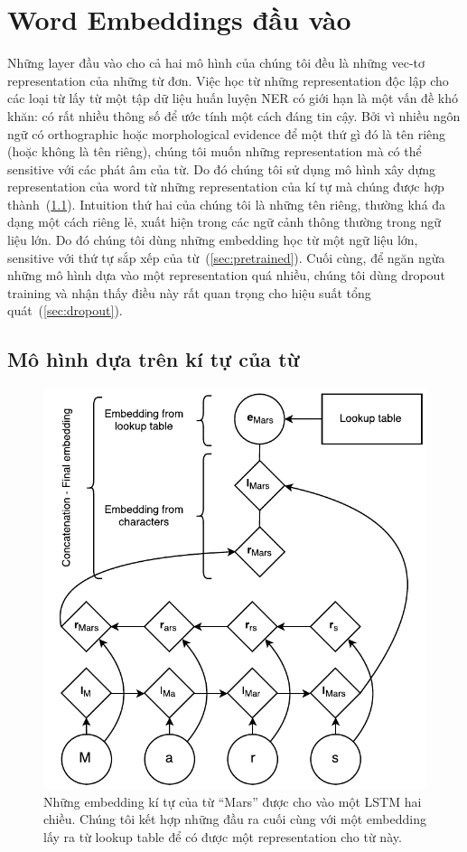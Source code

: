 \documentclass[11pt,letterpaper]{article}
\begin{document}
\section{Word Embeddings đầu vào}\label{sec:words}
Những layer đầu vào cho cả hai mô hình của chúng tôi đều là những vec-tơ representation của những từ đơn. Việc học từ những representation độc lập cho các loại từ lấy từ một tập dữ liệu huấn luyện NER có giới hạn là một vấn đề khó khăn: có rất nhiều thông số để ước tính một cách đáng tin cậy. Bởi vì nhiều ngôn ngữ có orthographic hoặc morphological evidence để một thứ gì đó là tên riêng (hoặc không là tên riêng), chúng tôi muốn những representation mà có thể sensitive với các phát âm của từ. Do đó chúng tôi sử dụng mô hình xây dựng representation của word từ những representation của kí tự mà chúng được hợp thành~(\ref{sec:character-model}).
Intuition thứ hai của chúng tôi là những tên riêng, thường khá đa dạng một cách riêng lẻ, xuất hiện trong các ngữ cảnh thông thường trong ngữ liệu lớn. Do đó chúng tôi dùng những embedding học từ một ngữ liệu lớn, sensitive với thứ tự sắp xếp của từ~(\ref{sec:pretrained}). Cuối cùng, để ngăn ngừa những mô hình dựa vào một representation quá nhiều, chúng tôi dùng dropout training và nhận thấy điều này rất quan trọng cho hiệu suất tổng quát~(\ref{sec:dropout}).

\subsection{Mô hình dựa trên kí tự của từ}
\label{sec:character-model}


\begin{figure}
  \centering
    \includegraphics[scale=0.68]{char-model4}
  \caption{Những embedding kí tự của từ ``Mars'' được cho vào một LSTM hai chiều. Chúng tôi kết hợp những đầu ra cuối cùng với một embedding lấy ra từ lookup table để có được một representation cho từ này.}
  \label{fig:char-model}
\end{figure}
\end{document}
